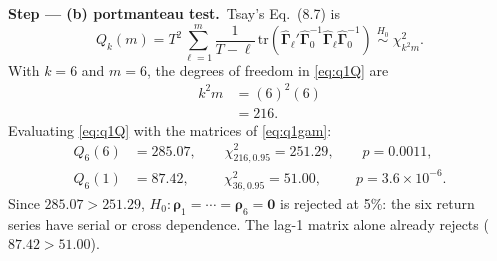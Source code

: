 \documentclass[11pt,a4paper]{article}
\newcommand{\passo}[2]{\par\smallskip\noindent\textbf{Step --- #1.}~#2}
\newcommand{\bGamma}{\bm{\Gamma}}\newcommand{\bPhi}{\bm{\Phi}}\newcommand{\bI}{\bm{I}}
\begin{document}
\begin{sol}
\passo{(b) portmanteau test}{Tsay's Eq.~(8.7) is
\begin{equation}
Q_k(m)=T^2\sum_{\ell=1}^{m}\frac{1}{T-\ell}\,\mathrm{tr}\!\left(\hat{\bGamma}_\ell'\hat{\bGamma}_0^{-1}\hat{\bGamma}_\ell\hat{\bGamma}_0^{-1}\right)
\;\overset{H_0}{\sim}\;\chi^2_{k^2m}.\label{eq:q1Q}
\end{equation}
With $k=6$ and $m=6$, the degrees of freedom in \eqref{eq:q1Q} are
\begin{align}
k^2m&=(6)^2(6)\nonumber\\
&=216.\nonumber
\end{align}
Evaluating \eqref{eq:q1Q} with the matrices of \eqref{eq:q1gam}:
\begin{align}
Q_6(6)&=285.07,\qquad \chi^2_{216,0.95}=251.29,\qquad p=0.0011,\nonumber\\
Q_6(1)&=87.42,\qquad\ \ \chi^2_{36,0.95}=51.00,\qquad\ \ p=3.6\times10^{-6}.\nonumber
\end{align}
Since $285.07>251.29$, $H_0:\bm\rho_1=\cdots=\bm\rho_6=\bm0$ is rejected at 5\%: the six return
series have serial or cross dependence. The lag-1 matrix alone already rejects ($87.42>51.00$).}


\end{sol}
\end{document}

